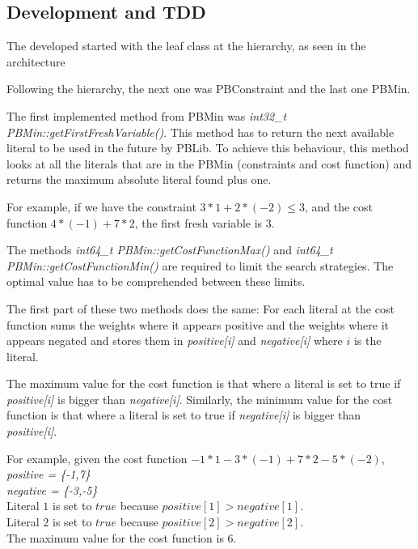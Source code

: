 
\subsection{Development and TDD}


The developed started with the leaf class at the hierarchy, as seen in the architecture %


Following the hierarchy, the next one was PBConstraint and the last one PBMin. 



The first implemented method from PBMin was \emph{int32\_t PBMin::getFirstFreshVariable()}. This method has to return the next available literal to be used in the future by PBLib. To achieve this behaviour, this method looks at all the literals that are in the PBMin (constraints and cost function) and returns the maximum absolute literal found plus one.  

For example, if we have the constraint $3*1 + 2*(-2) \leq 3$, and the cost function $4*(-1) + 7*2$, the first fresh variable is 3. 



The methods \emph{int64\_t PBMin::getCostFunctionMax()} and \emph{int64\_t PBMin::getCostFunctionMin()} are required to limit the search strategies. The optimal value has to be comprehended between these limits.  

The first part of these two methods does the same: For each literal at the cost function sums the weights where it appears positive and the weights where it appears negated and stores them in \emph{positive[i]} and \emph{negative[i]} where $i$ is the literal.

The maximum value for the cost function is that where a literal is set to true if \emph{positive[i]} is bigger than \emph{negative[i]}. Similarly, the minimum value for the cost function is that where a literal is set to true if \emph{negative[i]} is bigger than \emph{positive[i]}.

For example, given the cost function $-1*1 - 3*(-1) + 7*2 -5*(-2)$,\\
\emph{positive = \{-1,7\}}\\
\emph{negative = \{-3,-5\}}\\
Literal $1$ is set to $true$ because $positive[1] > negative[1]$.\\
Literal $2$ is set to $true$ because $positive[2] > negative[2]$.\\
The maximum value for the cost function is $6$.\\

